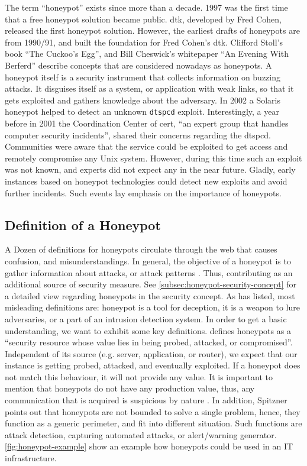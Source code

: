 The term \enquote{honeypot} exists since more than a decade.
1997 was the first time that a free honeypot solution became public.
\ac{dtk}, developed by Fred Cohen, released the first honeypot solution.
However, the earliest drafts of honeypots are from 1990/91, and built the foundation for Fred Cohen's \ac*{dtk}.
Clifford Stoll's book \enquote{The Cuckoo's Egg}\cite{stroll2000}, and Bill Cheswick's whitepaper \enquote{An Evening With Berferd}\cite{Cheswick92} describe concepts that are considered nowadays as honeypots.\cite{Spitzner2003}
A honeypot itself is a security instrument that collects information on buzzing attacks.
It disguises itself as a system, or application with weak links, so that it gets exploited and gathers knowledge about the adversary.
In 2002 a Solaris honeypot helped to detect an unknown \verb|dtspcd| exploit.
Interestingly, a year before in 2001 the Coordination Center of \ac{cert}, \enquote{an expert group that handles computer security incidents}\cite{cert2021}, shared their concerns regarding the dtspcd.
Communities were aware that the service could be exploited to get access and remotely compromise any Unix system.
However, during this time such an exploit was not known, and experts did not expect any in the near future.
Gladly, early instances based on honeypot technologies could detect new exploits and avoid further incidents.
Such events lay emphasis on the importance of honeypots.

\subsection{Definition of a Honeypot}

A Dozen of definitions for honeypots circulate through the web that causes confusion, and misunderstandings.
In general, the objective of a honeypot is to gather information about attacks, or attack patterns \cite{NawrockiWSKS2016}.
Thus, contributing as an additional source of security measure.
See \autoref{subsec:honeypot-security-concept} for a detailed view regarding honeypots in the security concept.
As \citet{Spitzner2003} has listed, most misleading definitions are: honeypot is a tool for deception, it is a weapon to lure adversaries, or a part of an intrusion detection system.
In order to get a basic understanding, we want to exhibit some key definitions.
\citet{Spitzner2003} defines honeypots as a \enquote{security resource whose value lies in being probed, attacked, or compromised}.
Independent of its source (e.g. server, application, or router), we expect that our instance is getting probed, attacked, and eventually exploited.
If a honeypot does not match this behaviour, it will not provide any value.
It is important to mention that honeypots do not have any production value, thus, any communication that is acquired is suspicious by nature \cite{Spitzner2003}.
In addition, Spitzner \citet{Spitzner2003} points out that honeypots are not bounded to solve a single problem, hence, they function as a generic perimeter, and fit into different situation.
Such functions are attack detection, capturing automated attacks, or alert/warning generator.
\autoref{fig:honeypot-example} show an example how honeypots could be used in an IT infrastructure.

